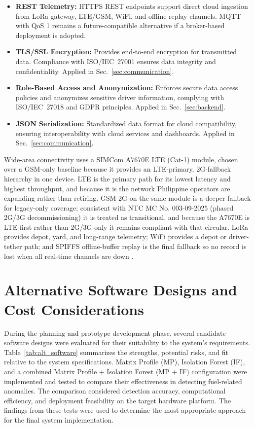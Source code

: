 \begin{itemize}  
    \item \textbf{REST Telemetry:} HTTPS REST endpoints support direct cloud ingestion from LoRa gateway, LTE/GSM, WiFi, and offline-replay channels. MQTT with QoS 1 remains a future-compatible alternative if a broker-based deployment is adopted.

    \item \textbf{TLS/SSL Encryption:} Provides end-to-end encryption for transmitted data. Compliance with ISO/IEC~27001 ensures data integrity and confidentiality. Applied in Sec.~\ref{sec:communication}.  

    \item \textbf{Role-Based Access and Anonymization:} Enforces secure data access policies and anonymizes sensitive driver information, complying with ISO/IEC~27018 and GDPR principles. Applied in Sec.~\ref{sec:backend}.  

    \item \textbf{JSON Serialization:} Standardized data format for cloud compatibility, ensuring interoperability with cloud services and dashboards. Applied in Sec.~\ref{sec:communication}.  
\end{itemize}  

Wide-area connectivity uses a SIMCom A7670E LTE (Cat-1) module, chosen over a GSM-only baseline because it provides an LTE-primary, 2G-fallback hierarchy in one device. LTE is the primary path for its lowest latency and highest throughput, and because it is the network Philippine operators are expanding rather than retiring. GSM 2G on the same module is a deeper fallback for legacy-only coverage; consistent with NTC MC No. 003-09-2025 (phased 2G/3G decommissioning) it is treated as transitional, and because the A7670E is LTE-first rather than 2G/3G-only it remains compliant with that circular. LoRa provides depot, yard, and long-range telemetry; WiFi provides a depot or driver-tether path; and SPIFFS offline-buffer replay is the final fallback so no record is lost when all real-time channels are down \cite{ntc2025legacy_network_phaseout}. 

\section{Alternative Software Designs and Cost Considerations}
\label{sec:alt_software_cost}

During the planning and prototype development phase, several candidate software designs were evaluated for their suitability to the system’s requirements. Table~\ref{tab:alt_software} summarizes the strengths, potential risks, and fit relative to the system specifications. Matrix Profile (MP), Isolation Forest (IF), and a combined Matrix Profile + Isolation Forest (MP + IF) configuration were implemented and tested to compare their effectiveness in detecting fuel-related anomalies. The comparison considered detection accuracy, computational efficiency, and deployment feasibility on the target hardware platform. The findings from these tests were used to determine the most appropriate approach for the final system implementation.

